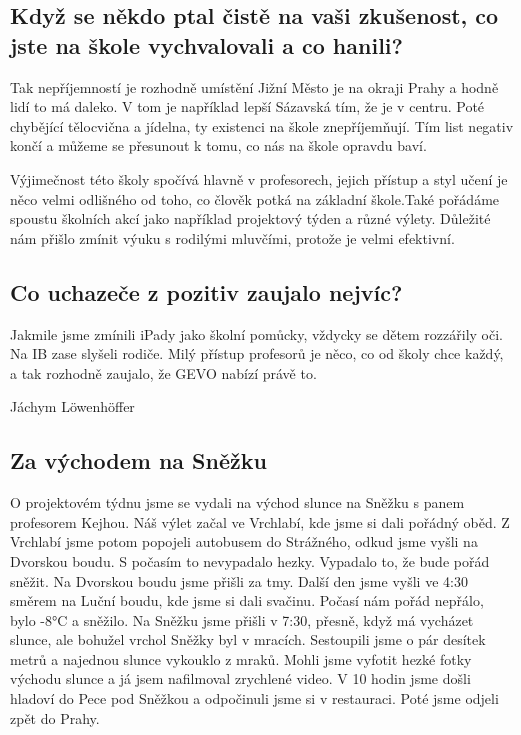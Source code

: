 \documentclass[12pt, a4paper]{article}
\begin{document}
\begin{multicols*}{2}
		\subsection*{Když se někdo ptal čistě na vaši zkušenost, co jste na škole vychvalovali a co hanili?}
		Tak nepříjemností je rozhodně umístění  Jižní Město je na okraji Prahy a hodně lidí to má daleko. V tom je například lepší Sázavská tím, že je v centru. Poté chybějící tělocvična a jídelna, ty existenci na škole znepříjemňují. Tím list negativ končí a můžeme se přesunout k tomu, co nás na škole opravdu baví.

		\noindent Výjimečnost této školy spočívá hlavně v profesorech, jejich přístup a styl učení je něco velmi odlišného od toho, co člověk potká na základní škole.Také pořádáme spoustu školních akcí jako například projektový týden a různé výlety. Důležité nám přišlo zmínit výuku s rodilými mluvčími, protože je velmi efektivní.

		\subsection*{Co uchazeče z pozitiv zaujalo nejvíc?}
		Jakmile jsme zmínili iPady jako školní pomůcky, vždycky se dětem rozzářily oči. Na IB zase slyšeli rodiče. Milý přístup profesorů je něco, co od školy chce každý, a tak rozhodně zaujalo, že GEVO nabízí právě to.
		\vspace*{-1\baselineskip}
		\begin{flushright}
			\footnotesize Jáchym Löwenhöffer
		\end{flushright}
		
		\begin{center}
			\section*{Za východem  na Sněžku}
		\end{center}
		O projektovém týdnu jsme se vydali na východ slunce na Sněžku s panem profesorem Kejhou. Náš výlet začal ve Vrchlabí, kde jsme si dali pořádný oběd. Z Vrchlabí jsme potom popojeli autobusem do Strážného, odkud jsme vyšli na Dvorskou boudu. S počasím to nevypadalo hezky. Vypadalo to, že bude pořád sněžit. Na Dvorskou boudu jsme přišli za tmy. Další den jsme vyšli ve 4:30 směrem na Luční boudu, kde jsme si dali svačinu. Počasí nám pořád nepřálo, bylo -8°C a sněžilo. Na Sněžku jsme přišli v 7:30, přesně, když má vycházet slunce, ale bohužel vrchol Sněžky byl v mracích. Sestoupili jsme o pár desítek metrů a najednou slunce vykouklo z mraků. Mohli jsme vyfotit hezké fotky východu slunce a já jsem nafilmoval zrychlené video. V 10 hodin jsme došli hladoví do Pece pod Sněžkou a odpočinuli jsme si v restauraci. Poté jsme odjeli zpět do Prahy.


\end{multicols*}
\end{document}
